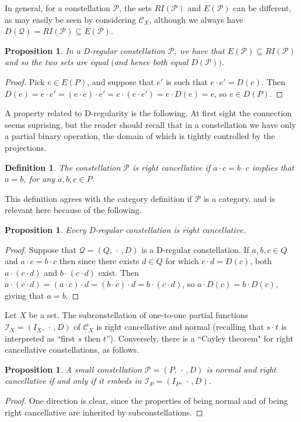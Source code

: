 \documentclass[12pt]{amsart}
\newtheorem{pro}[thm]{Proposition}
\newtheorem{dfn}[thm]{Definition}
\theoremstyle{definition}
\newcommand{\Pcon}{\mathcal P}
\newcommand{\Q}{\mathcal Q}
\newcommand{\C}{\mathcal C}
\newcommand{\I}{\mathcal I}
\begin{document}
{In general, for a constellation $\Pcon$, the sets $RI(\Pcon)$ and $E(\Pcon)$ can be different, as may easily be seen by considering $\C_X$, although we always have $D(\Q)=RI(\Pcon)\subseteq E(\Pcon)$.   

\begin{pro}  \label{EPinRIP}
In a D-regular constellation $\Pcon$, we have that $E(\Pcon)\subseteq RI(\Pcon)$ and so the two sets are equal $($and hence both equal $D(\Pcon)$$)$.
\end{pro} 
\begin{proof}
Pick $e\in E(P)$, and suppose that $e'$ is such that $e\cdot e'=D(e)$.  Then $D(e)=e\cdot e'=(e\cdot e)\cdot e'=e\cdot(e\cdot e')=e\cdot D(e)=e$, so $e\in D(P)$.
\end{proof}

A property related to D-regularity is the following. At first sight the connection seems suprising, but the reader should recall that in a constellation we have only a partial binary operation, the domain of which is tightly controlled by the projections.

\begin{dfn}
The  constellation $\Pcon$ is {\em right cancellative} if $a\cdot c=b\cdot c$ implies that  $a=b$, for any $a,b,c\in P$.
\end{dfn}

This definition agrees with the category definition if $\Pcon$ is a category, and is relevant here because of the following.

\begin{pro}  \label{monic}
Every D-regular constellation is right cancellative.  
\end{pro}
\begin{proof}
Suppose that $\Q=(Q,\, \cdot\, , D)$ is a D-regular constellation.  If $a,b,c\in Q$ and $a\cdot c=b\cdot c$ then since there exists $d\in Q$ for which $c\cdot d=D(c)$, both $a\cdot (c\cdot d)$ and $b\cdot (c\cdot d)$ exist.
Then  $a\cdot (c\cdot d)=(a\cdot c)\cdot d=(b\cdot c)\cdot d=b\cdot (c\cdot d)$, so $a\cdot D(c)=b\cdot D(c)$, giving that  $a=b$.
\end{proof}

Let $X$ be a set. The subconstellation of one-to-one partial functions $\I_X=(I_X,\, \cdot\, ,D)$ of $\C_X$ is right cancellative and normal (recalling that $s\cdot t$ is interpreted as ``first $s$ then $t$'').  Conversely, there is a ``Cayley theorem" for right cancellative constellations, as follows.

\begin{pro}  \label{rcinj} A small constellation $\Pcon=(P,\, \cdot\, ,D)$  is normal and right cancellative if and only if it embeds in $\I_P=(I_P,\, \cdot\, ,D)$. 
\end{pro}
\begin{proof}  One direction is clear, since the properties of being normal and of being right cancellative are inherited by subconstellations.


\end{proof}}
\end{document}
